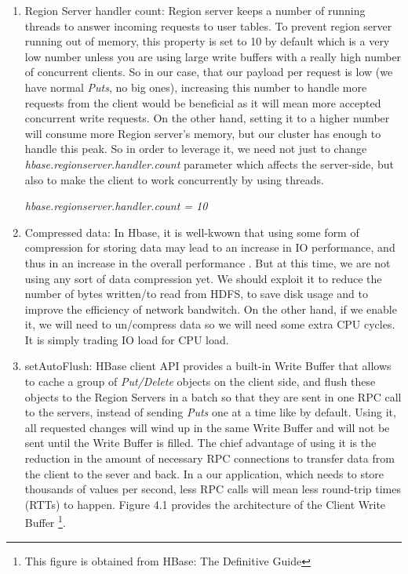 \begin{enumerate}
\item Region Server handler count:
\bigskip
Region server keeps a number of running threads to answer incoming requests to user tables. To prevent region server running out of memory, this property is set to 10 by default which is a very low number unless you are using large write buffers with a really high number of concurrent clients. So in our case, that our payload per request is low (we have normal \textit{Puts}, no big ones), increasing this number to handle more requests from the client would be beneficial as it will mean more accepted concurrent write requests. On the other hand, setting it to a higher number will consume more Region server's memory, but our cluster has enough to handle this peak. So in order to leverage it, we need not just to change \textit{hbase.regionserver.handler.count} parameter which affects the server-side, but also to make the client to work concurrently by using threads.
\bigskip
\centerline{\textit{hbase.regionserver.handler.count = 10}}
\bigskip
\item Compressed data:
\bigskip
In Hbase, it is well-kwown that using some form of compression for storing data may lead to an increase in IO performance, and thus in an increase in the overall performance \cite{raichand2013short} \cite{cheng2013key} \cite{aiyer2012storage} \cite{ApacheHBaseCompression}. But at this time, we are not using any sort of data compression yet. We should exploit it to reduce the number of bytes written/to read from HDFS, to save disk usage and to improve the efficiency of network bandwitch. On the other hand, if we enable it, we will need to un/compress data so we will need some extra CPU cycles. It is simply trading IO load for CPU load.

 \bigskip

\item setAutoFlush:
\bigskip
HBase client API provides a built-in Write Buffer that allows to cache a group of \textit{Put/Delete} objects on the client side, and flush these objects to the Region Servers in a batch so that they are sent in one RPC call to the servers, instead of sending \textit{Puts} one at a time like by default. Using it, all requested changes will wind up in the same Write Buffer and will not be sent until the Write Buffer is filled. The chief advantage of using it is the reduction in the amount of necessary RPC connections to transfer data from the client to the sever and back. In a our application, which needs to store thousands of values per second, less RPC calls will mean less round-trip times (RTTs) to happen. Figure 4.1 provides the architecture of the Client Write Buffer \footnote{This figure is obtained from HBase: The Definitive Guide}.


\end{enumerate}
